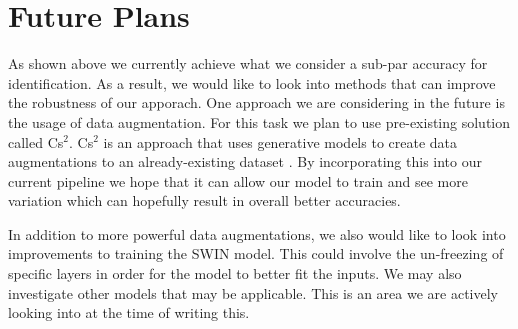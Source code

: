 \documentclass[10pt,twocolumn,letterpaper]{article}
\begin{document}
\section{Future Plans}

As shown above we currently achieve what we consider a sub-par accuracy for identification. As a result, we would like to look into methods that can improve the robustness of our apporach. One approach we are considering in the future is the usage of data augmentation. For this task we plan to use pre-existing solution called Cs$^2$. Cs$^2$ is an approach that uses generative models to create data augmentations to an already-existing dataset \cite{cs2}. By incorporating this into our current pipeline we hope that it can allow our model to train and see more variation which can hopefully result in overall better accuracies.  \par

In addition to more powerful data augmentations, we also would like to look into improvements to training the SWIN model. This could involve the un-freezing of specific layers in order for the model to better fit the inputs. We may also investigate other models that may be applicable. This is an area we are actively looking into at the time of writing this. \par 
\end{document}
